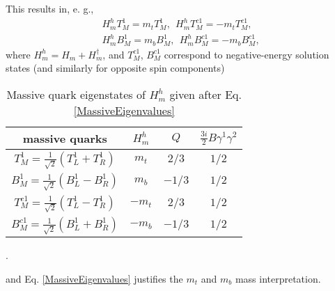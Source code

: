 \documentclass[12pt]{article}
\renewcommand\[{\begin{dmath}}
\renewcommand\]{\end{dmath}}
\begin{document}
This results in,
e. g.,
\begin{eqnarray}
\nonumber
 H_m^h T_{M}^1=m_t T_{M}^1, \ \   H_m^h  T_{M}^{c1} =-m_t T_{M}^{c1}  , \\
   \label{MassiveEigenvalues}  H_m^h B_{M}^1 =m_b B_{M}^1 , \  \  H_m^h  B_{M}^{c1} =-m_b B_{M}^{c1},
 \end{eqnarray}
 where $H_m^h=H_m+H_m^\dagger$, and $T_{M}^{c1}$, $B_{M}^{c1}$ correspond to negative-energy solution states (and similarly   for opposite spin components)
\begin{table}[ht]
\noindent \begin{centering}
\begin{tabular}{|c|c|c|c|}
\hline
  massive quarks & $H_m^h$ & $Q$ & $\frac{3i}{2}B\gamma^{1}\gamma^{2}$\tabularnewline
\hline
\hline
$ T_{M}^1 =\frac{1}{\sqrt{2}} ({T_L^1}+{T_R^1} )$ & $m_t$ & $2/3$ & $ 1/2$\tabularnewline
\hline
$B_{M}^1=\frac{1}{\sqrt{2}} ({B_L^1}-{B_R^1} )$ & $m_b$ & $-1/3$ & $ 1/2$\tabularnewline
\hline
$T_{M}^{c1} =\frac{1}{\sqrt{2}} (T_{L}^1-T_{R}^1 )$ & $-m_t$ & $2/3$ & $ 1/2$\tabularnewline
\hline
$B_{M}^{c1}=\frac{1}{\sqrt{2}}({B_L^1}+{B_R^1})$ & $-m_b$ & $-1/3$ & $ 1/2$\tabularnewline
\hline
\end{tabular}
\par\end{centering} \label{Tmassivequark}
\caption{Massive quark  eigenstates of $H_m^h$ given after Eq. \ref{MassiveEigenvalues}}.
\end{table}
and  Eq. \ref{MassiveEigenvalues} justifies  the $m_t$ and  $m_b$ mass interpretation.
\end{document}
